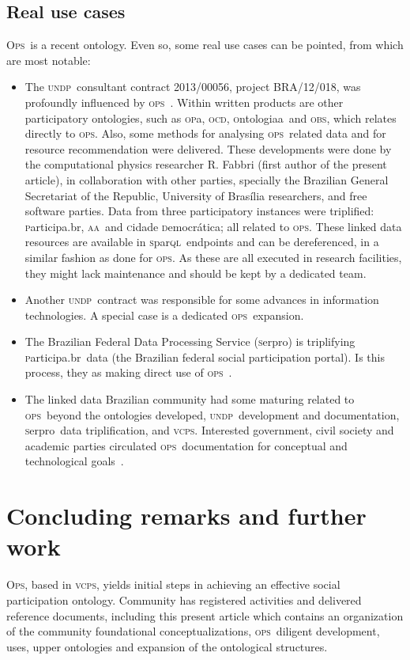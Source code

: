 \documentclass[10pt,letterpaper]{article}
\newcommand{\ops}{\textsc{ops}}
\newcommand{\opsi}{O\textsc{ps}}
\newcommand{\vcps}{\textsc{vcps}}
\newcommand{\sparql}{\textsc{s}par\textsc{ql}}
\newcommand{\opa}{\textsc{op}a}
\newcommand{\ocd}{\textsc{ocd}}
\newcommand{\ontologiaa}{\textsc{o}ntologiaa}
\newcommand{\obs}{\textsc{obs}}
\newcommand{\aan}{\textsc{aa}}
\newcommand{\cidadedemocratica}{\textsc{c}idade \textsc{d}emocr\'atica}
\newcommand{\participa}{\textsc{p}articipa.br}
\newcommand{\pnud}{\textsc{undp}}
\newcommand{\serpro}{\textsc{s}erpro}
\begin{document}
\subsection{Real use cases}\label{sec:real}
\opsi\ is a recent ontology. Even so, some real use cases can be pointed, from which are most notable:
\begin{itemize}
    \item The \pnud\ consultant contract 2013/00056, project BRA/12/018, was profoundly influenced by \ops~\cite{pnud5}. Within written products are other participatory ontologies, such as \opa, \ocd, \ontologiaa\ and \obs, which relates directly to \ops. Also, some methods for analysing \ops\ related data and for resource recommendation were delivered. These developments were done by the computational physics researcher R. Fabbri (first author of the present article), in collaboration with other parties, specially the Brazilian General Secretariat of the Republic, University of Bras\'ilia researchers, and free software parties. Data from three participatory instances were triplified: \participa, \aan\ and \cidadedemocratica; all related to \ops. These linked data resources are available in \sparql\ endpoints and can be dereferenced, in a similar fashion as done for \ops. As these are all executed in research facilities, they might lack maintenance and should be kept by a dedicated team.
    \item Another \pnud\ contract was responsible for some advances in information technologies. A special case is a dedicated \ops\ expansion\cite{paulo6}.
    \item The Brazilian Federal Data Processing Service (\serpro) is triplifying \participa\ data (the Brazilian federal social participation portal). Is this process, they as making direct use of \ops~\cite{tripSerpro}.
    \item The linked data Brazilian community had some maturing related to \ops\ beyond the ontologies developed, \pnud\ development and documentation, \serpro\ data triplification, and \vcps. Interested government, civil society and academic parties circulated \ops\ documentation for conceptual and technological goals~\cite{circulaOps1,circulaOps2}.
\end{itemize}

\section{Concluding remarks and further work}\label{conc}
\opsi, based in \vcps,
yields initial steps in achieving an effective social participation ontology.
Community has registered activities and delivered reference documents, including this present article which contains 
an organization of the community foundational conceptualizations,
\ops\ diligent development, uses,
upper ontologies and expansion of the ontological structures.
\end{document}
